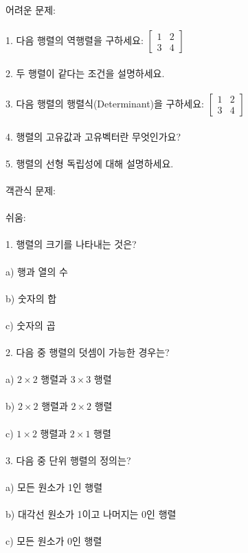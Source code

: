 \documentclass[fleqn]{article}
\begin{document}
어려운 문제: \\\\
1. 다음 행렬의 역행렬을 구하세요: \(\begin{bmatrix} 1 & 2 \\ 3 & 4 \end{bmatrix}\) \\\\
2. 두 행렬이 같다는 조건을 설명하세요. \\\\
3. 다음 행렬의 행렬식(Determinant)을 구하세요: \(\begin{bmatrix} 1 & 2 \\ 3 & 4 \end{bmatrix}\) \\\\
4. 행렬의 고유값과 고유벡터란 무엇인가요? \\\\
5. 행렬의 선형 독립성에 대해 설명하세요. \\\\

객관식 문제: \\\\
쉬움: \\\\
1. 행렬의 크기를 나타내는 것은? \\\\
   a) 행과 열의 수 \\\\
   b) 숫자의 합 \\\\
   c) 숫자의 곱 \\\\
  
2. 다음 중 행렬의 덧셈이 가능한 경우는? \\\\
   a) \(2 \times 2\) 행렬과 \(3 \times 3\) 행렬 \\\\
   b) \(2 \times 2\) 행렬과 \(2 \times 2\) 행렬 \\\\
   c) \(1 \times 2\) 행렬과 \(2 \times 1\) 행렬 \\\\
  
3. 다음 중 단위 행렬의 정의는? \\\\
   a) 모든 원소가 1인 행렬 \\\\
   b) 대각선 원소가 1이고 나머지는 0인 행렬 \\\\
   c) 모든 원소가 0인 행렬 \\\\
  
\end{document}
